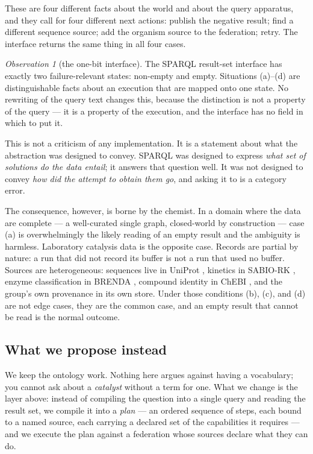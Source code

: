 \documentclass[11pt,a4paper]{article}
\theoremstyle{plain}
\theoremstyle{definition}
\theoremstyle{remark}
\newtheorem{observation}[theorem]{Observation}
\begin{document}
These are four different facts about the world and about the query
apparatus, and they call for four different next actions: publish the
negative result; find a different sequence source; add the organism
source to the federation; retry. The interface returns the same thing in
all four cases.

\begin{observation}[the one-bit interface]
\label{obs:onebit}
The SPARQL result-set interface has exactly two failure-relevant states:
non-empty and empty. Situations (a)--(d) are distinguishable facts about
an execution that are mapped onto one state. No rewriting of the query
text changes this, because the distinction is not a property of the
query --- it is a property of the execution, and the interface has no
field in which to put it.
\end{observation}

This is not a criticism of any implementation. It is a statement about
what the abstraction was designed to convey. SPARQL was designed to
express \emph{what set of solutions do the data entail}; it answers that
question well. It was not designed to convey \emph{how did the attempt
to obtain them go}, and asking it to is a category error.

The consequence, however, is borne by the chemist. In a domain where the
data are complete --- a well-curated single graph, closed-world by
construction --- case (a) is overwhelmingly the likely reading of an
empty result and the ambiguity is harmless. Laboratory catalysis data is
the opposite case. Records are partial by nature: a run that did not
record its buffer is not a run that used no buffer. Sources are
heterogeneous: sequences live in UniProt \citep{UniProt2023}, kinetics
in SABIO-RK \citep{Wittig2018}, enzyme classification in BRENDA
\citep{Chang2021}, compound identity in ChEBI \citep{Hastings2016}, and
the group's own provenance in its own store. Under those conditions
(b), (c), and (d) are not edge cases, they are the common case, and an
empty result that cannot be read is the normal outcome.

\subsection{What we propose instead}

We keep the ontology work. Nothing here argues against having a
vocabulary; you cannot ask about a \emph{catalyst} without a term for
one. What we change is the layer above: instead of compiling the
question into a single query and reading the result set, we compile it
into a \emph{plan} --- an ordered sequence of steps, each bound to a
named source, each carrying a declared set of the capabilities it
requires --- and we execute the plan against a federation whose sources
declare what they can do.
\end{document}
